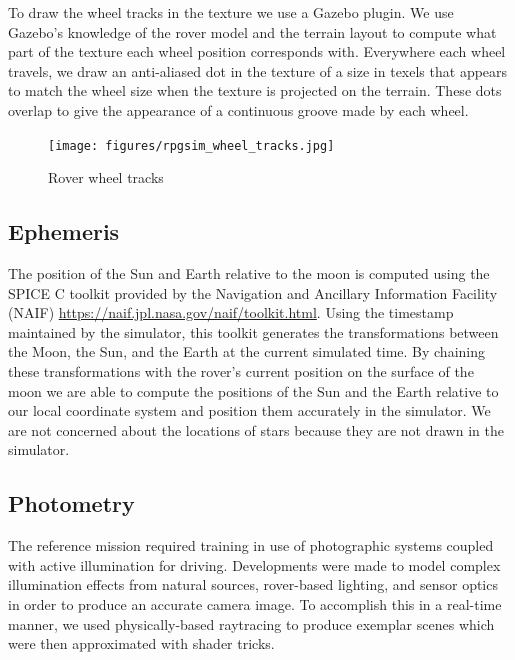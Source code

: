 \documentclass[twocolumn,letterpaper]{IEEEAerospaceCLS}  %
\begin{document}
To draw the wheel tracks in the texture we use a Gazebo plugin. We use Gazebo's knowledge of the rover model and the terrain layout to compute what part of the texture each wheel position corresponds with. Everywhere each wheel travels, we draw an anti-aliased dot in the texture of a size in texels that appears to match the wheel size when the texture is projected on the terrain. These dots overlap to give the appearance of a continuous groove made by each wheel.
\begin{figure}[h!]
	\texttt{[image: figures/rpgsim\_wheel\_tracks.jpg]}
   	\caption{Rover wheel tracks}
    \label{fig:wheeltracks}
\end{figure}

\subsection{Ephemeris}
The position of the Sun and Earth relative to the moon is computed using the SPICE C toolkit provided by the Navigation and Ancillary Information Facility (NAIF) \url{https://naif.jpl.nasa.gov/naif/toolkit.html}.  Using the timestamp maintained by the simulator, this toolkit generates the transformations between the Moon, the Sun, and the Earth at the current simulated time.  By chaining these transformations with the rover's current position on the surface of the moon we are able to compute the positions of the Sun and the Earth relative to our local coordinate system and position them accurately in the simulator.  We are not concerned about the locations of stars because they are not drawn in the simulator.

\subsection {Photometry}
The reference mission required training in use of photographic systems coupled with active illumination for driving. Developments were made to model complex illumination effects from natural sources, rover-based lighting, and sensor optics in order to produce an accurate camera image. To accomplish this in a real-time manner, we used physically-based raytracing to produce exemplar scenes which were then approximated with shader tricks. 
\end{document}
